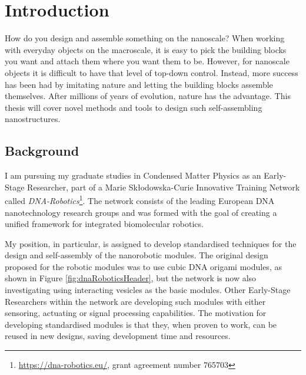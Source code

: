 
\chapter{Introduction}\label{ch:1-intro}

\minitoc

How do you design and assemble something on the nanoscale? When working with everyday objects on the macroscale, it is easy to pick the building blocks you want and attach them where you want them to be. However, for nanoscale objects it is difficult to have that level of top-down control. Instead, more success has been had by imitating nature and letting the building blocks assemble themselves. After millions of years of evolution, nature has the advantage. This thesis will cover novel methods and tools to design such self-assembling nanostructures.

\section{Background}
I am pursuing my graduate studies in Condensed Matter Physics as an Early-Stage Researcher, part of a Marie Skłodowska-Curie Innovative Training Network called \emph{DNA-Robotics}\footnote{\url{https://dna-robotics.eu/}, grant agreement number 765703}. The network consists of the leading European DNA nanotechnology research groups and was formed with the goal of creating a unified framework for integrated biomolecular robotics\cite{dnaroboticsResearch}.

My position, in particular, is assigned to develop standardised techniques for the design and self-assembly of the nanorobotic modules\cite{dnaroboticsESR12}. The original design proposed for the robotic modules was to use cubic DNA origami modules, as shown in Figure \ref{fig:dnaRoboticsHeader}, but the network is now also investigating using interacting vesicles as the basic modules. Other Early-Stage Researchers within the network are developing such modules with either sensoring, actuating or signal processing capabilities. The motivation for developing standardised modules is that they, when proven to work, can be reused in new designs, saving development time and resources.

